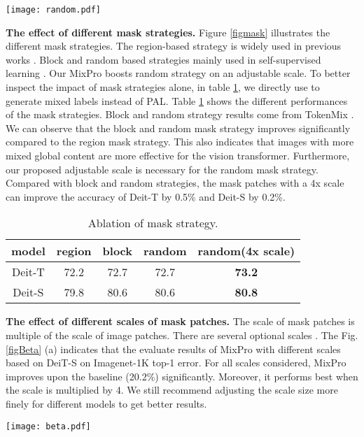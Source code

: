\documentclass{article} \usepackage{iclr2023_conference,times}
\begin{document}
\begin{figure*}[!htb]
\centering
\texttt{[image: random.pdf]}
\caption{Illustration of different mask strategies.}
\label{figmask}
\end{figure*}



\textbf{The effect of different mask strategies.} Figure \ref{figmask} illustrates the different mask strategies. The region-based strategy is widely used in previous works \citep{yun2019cutmix,uddin2020saliencymix,cutout}. Block and random based strategies mainly used in self-supervised learning \citep{he2022masked, bao2021beit}. Our MixPro boosts random strategy on an adjustable scale. To better inspect the impact of mask strategies alone, in table \ref{tabmask}, we directly use  to generate mixed labels instead of PAL. Table \ref{tabmask} shows the different performances of the mask strategies. Block and random strategy results come from TokenMix \citep{liu2022tokenmix}. We can observe that the block and random mask strategy improves significantly compared to the region mask strategy. This also indicates that images with more mixed global content are more effective for the vision transformer. Furthermore, our proposed adjustable scale is necessary for the random mask strategy. Compared with block and random strategies, the mask patches with a 4x scale can improve the accuracy of Deit-T by 0.5\% and Deit-S by 0.2\%.


\begin{table}[!htb]
\caption{Ablation of mask strategy.}
\label{tabmask}
	\centering
	\begin{tabular}{ccccc}
    \toprule
     model & region &block & random   & random(4x scale)   \\
    \midrule
     Deit-T & 72.2    & 72.7  & 72.7  & \textbf{73.2}     \\
     Deit-S &  79.8  & 80.6  & 80.6 & \textbf{80.8}     \\

    \bottomrule
\end{tabular}
\end{table}

\textbf{The effect of different scales of mask patches.}
The scale of mask patches  is multiple of the scale of image patches.  There are several optional scales . The Fig. \ref{figBeta} (a) indicates that the evaluate results of MixPro with different scales based on DeiT-S on Imagenet-1K top-1 error. For all scales considered, MixPro improves upon the baseline (20.2\%) significantly. Moreover, it performs best when the scale is multiplied by 4. We still recommend adjusting the scale size more finely for different models to get better results.
\begin{figure*}[!htb]
\centering
\texttt{[image: beta.pdf]}

\caption{Effect of different scales of mask patch and  on Imagenet-1K top-1 error with DeiT-S.}
\label{figBeta}
\end{figure*}
\end{document}
